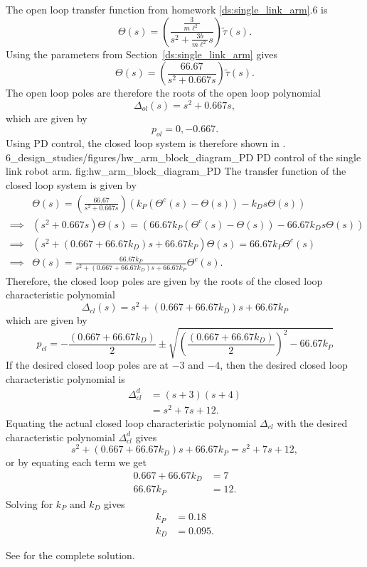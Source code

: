 
The open loop transfer function from homework \ref{ds:single_link_arm}.6 is
\[
\Theta(s) = \left(\frac{\frac{3}{m\ell^2}}{s^2+\frac{3b}{m\ell^2}s}\right)\tilde{\tau}(s).  
\]
Using the parameters from Section~\ref{ds:single_link_arm} gives
\[
\Theta(s) = \left(\frac{66.67}{s^2+0.667s}\right)\tilde{\tau}(s).  
\]
The open loop poles are therefore the roots of the open loop polynomial
\[
\Delta_{ol}(s) = s^2+0.667s,
\]
which are given by
\[
p_{ol} = 0, -0.667.
\]
Using PD control, the closed loop system is therefore shown in .
	{6_design_studies/figures/hw_arm_block_diagram_PD}
	{PD control of the single link robot arm.}
	{fig:hw_arm_block_diagram_PD}
The transfer function of the closed loop system is given by
\begin{align*}
& \Theta(s) = \left(\frac{66.67}{s^2+0.667s}\right)\left(k_P (\Theta^c(s)-\Theta(s)) - k_D s \Theta(s) \right)  \\
\implies & (s^2+0.667s)\Theta(s) = \left(66.67k_P (\Theta^c(s)-\Theta(s)) - 66.67k_D s \Theta(s) \right) \\
\implies & (s^2 + (0.667 + 66.67k_D)s + 66.67k_P)\Theta(s) = 66.67k_P \Theta^c(s)  \\
\implies & \Theta(s) = \frac{66.67k_P}{s^2 + (0.667 + 66.67k_D)s + 66.67k_P}\Theta^c(s). 
\end{align*}
Therefore, the closed loop poles are given by the roots of the closed loop characteristic polynomial
\[
\Delta_{cl}(s) = s^2 + (0.667 + 66.67k_D)s + 66.67k_P
\]
which are given by
\[
p_{cl} = -\frac{(0.667 + 66.67k_D)}{2} \pm \sqrt{ \left(\frac{(0.667 + 66.67k_D)}{2}\right)^2 - 66.67k_P}
\]
If the desired closed loop poles are at $-3$ and $-4$, then the desired closed loop characteristic polynomial is
\begin{align*}
\Delta_{cl}^d &= (s+3)(s+4) \\
 &= s^2 + 7s + 12.
\end{align*}
Equating the actual closed loop characteristic polynomial $\Delta_{cl}$ with the desired characteristic polynomial $\Delta_{cl}^d$ gives
\[
s^2 + (0.667 + 66.67k_D)s + 66.67k_P = s^2 + 7s + 12,
\]
or by equating each term we get 
\begin{align*}
0.667 + 66.67k_D &=7 \\
66.67k_P &= 12.
\end{align*}
Solving for $k_P$ and $k_D$ gives
\begin{align*}
k_P &= 0.18 \\
k_D &= 0.095.
\end{align*}

See  for the complete solution.

